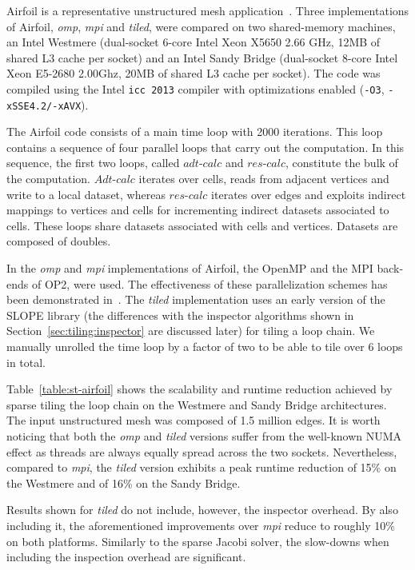 Airfoil is a representative unstructured mesh application~\citep{AIRFOIL}. Three implementations of Airfoil, {\em omp}, {\em mpi} and {\em tiled}, were compared on two shared-memory machines, an Intel Westmere (dual-socket 6-core Intel Xeon X5650 2.66 GHz, 12MB of shared L3 cache per socket) and an Intel Sandy Bridge (dual-socket 8-core Intel Xeon E5-2680 2.00Ghz, 20MB of shared L3 cache per socket). The code was compiled using the Intel \texttt{icc 2013} compiler with optimizations enabled (\texttt{-O3}, \texttt{-xSSE4.2/-xAVX}).

The Airfoil code consists of a main time loop with 2000 iterations. This loop contains a sequence of four parallel loops that carry out the computation. In this sequence, the first two loops, called $adt$-$calc$ and $res$-$calc$, constitute the bulk of the computation. $Adt$-$calc$ iterates over cells, reads from adjacent vertices and write to a local dataset, whereas $res$-$calc$ iterates over edges and exploits indirect mappings to vertices and cells for incrementing indirect datasets associated to cells. These loops share datasets associated with cells and vertices. Datasets are composed of doubles.

In the {\em omp} and {\em mpi} implementations of Airfoil, the OpenMP and the MPI back-ends of OP2, were used. The effectiveness of these parallelization schemes has been demonstrated in~\cite{op2-main}. The {\em tiled} implementation uses an early version of the SLOPE library (the differences with the inspector algorithms shown in Section~\ref{sec:tiling:inspector} are discussed later) for tiling a loop chain. We manually unrolled the time loop by a factor of two to be able to tile over 6 loops in total. 


Table~\ref{table:st-airfoil} shows the scalability and runtime reduction achieved by sparse tiling the loop chain on the Westmere and Sandy Bridge architectures. The input unstructured mesh was composed of 1.5 million edges. It is worth noticing that both the {\em omp} and {\em tiled} versions suffer from the well-known NUMA effect as threads are always equally spread across the two sockets. Nevertheless, compared to {\em mpi}, the {\em tiled} version exhibits a peak runtime reduction of 15\% on the Westmere and of 16\% on the Sandy Bridge. 

Results shown for {\em tiled} do not include, however, the inspector overhead. By also including it, the aforementioned improvements over {\em mpi} reduce to roughly 10\% on both platforms. Similarly to the sparse Jacobi solver, the slow-downs when including the inspection overhead are significant.


